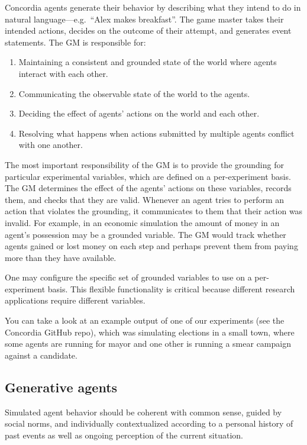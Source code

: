 \documentclass[11pt, a4paper, logo, twocolumn, internal, copyright, numbering]{googledeepmind}
\begin{document}
Concordia agents generate their behavior by describing what they intend to do in natural language---e.g.~``Alex makes breakfast''. The game master takes their intended actions, decides on the outcome of their attempt, and generates event statements.
The GM is responsible for:
\begin{enumerate}
    \item Maintaining a consistent and grounded state of the world where agents interact with each other.
    \item Communicating the observable state of the world to the agents.
    \item Deciding the effect of agents' actions on the world and each other.
    \item Resolving what happens when actions submitted by multiple agents conflict with one another.
\end{enumerate}

The most important responsibility of the GM is to provide the grounding for particular experimental variables, which are defined on a per-experiment basis. The GM determines the effect of the agents’ actions on these variables, records them, and checks that they are valid. Whenever an agent tries to perform an action that violates the grounding, it communicates to them that their action was invalid. For example, in an economic simulation the amount of money in an agent’s possession may be a grounded variable. The GM would track whether agents gained or lost money on each step and perhaps prevent them from paying more than they have available.

One may configure the specific set of grounded variables to use on a per-experiment basis. This flexible functionality is critical because different research applications require different  variables.

You can take a look at an example output of one of our experiments (see the Concordia GitHub repo), which was simulating elections in a small town, where some agents are running for mayor and one other is running a smear campaign against a candidate.


\subsection{Generative agents}\label{section:generativeAgents}

Simulated agent behavior should be coherent with common sense, guided by social norms, and individually contextualized according to a personal history of past events as well as ongoing perception of the current situation.
\end{document}
